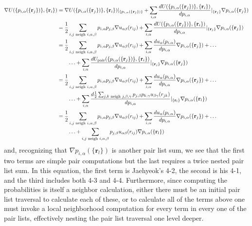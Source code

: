 \documentclass[11pt, oneside]{article}   	%
\begin{document}
\begin{align}
\nabla U(\{p_{i, \alpha}(\{\mathbf{r}_j\})\}, \{\mathbf{r}_i\}) &= \nabla U(\{p_{i, \alpha}(\{\mathbf{r}_j\})\}, \{\mathbf{r}_i\}) |_{\{p_{i, \alpha}(\{\mathbf{r}_j\})\}} + \sum_{i, \alpha} \frac{d U(\{p_{i, \alpha}(\{\mathbf{r}_j\})\}, \{\mathbf{r}_i\})}{d p_{i, \alpha}} |_{\{\mathbf{r}_j\}} \nabla p_{i, \alpha}(\{\mathbf{r}_j\}) \\
&= \frac{1}{2} \sum_{i, j \text{ neigh } i, \alpha, \beta} p_{i, \alpha} p_{j, \beta} \nabla u_{\alpha\beta}(r_{ij}) + \sum_{i, \alpha} \frac{d U(\{p_{i, \alpha}(\{\mathbf{r}_j\})\}, \{\mathbf{r}_i\})}{d p_{i, \alpha}} |_{\{\mathbf{r}_j\}} \nabla p_{i, \alpha}(\{\mathbf{r}_j\}) \\
&=  \frac{1}{2} \sum_{i, j \text{ neigh } i, \alpha, \beta} p_{i, \alpha} p_{j, \beta} \nabla u_{\alpha\beta}(r_{ij}) + \sum_{i, \alpha} \frac{du_\alpha(p_{i, \alpha})}{d p_{i, \alpha}} \nabla p_{i, \alpha}(\{\mathbf{r}_j\})  +  \ldots \notag \\  & \qquad \ldots + \sum_{i, \alpha} \frac{d U_{\text{pair}}(\{p_{i, \alpha}(\{\mathbf{r}_j\})\}, \{\mathbf{r}_i\})}{d p_{i, \alpha}} |_{\{\mathbf{r}_j\}} \nabla p_{i, \alpha}(\{\mathbf{r}_j\}) \\
&= \frac{1}{2} \sum_{i, j \text{ neigh } i, \alpha, \beta} p_{i, \alpha} p_{j, \beta} \nabla u_{\alpha\beta}(r_{ij}) + \sum_{i, \alpha} \frac{du_\alpha(p_{i, \alpha})}{d p_{i, \alpha}} \nabla p_{i, \alpha}(\{\mathbf{r}_j\})  +  \ldots \notag \\  & \qquad \ldots + \sum_{i, \alpha} \frac{d \frac{1}{2} \sum_{j, k \text{ neigh } j, \beta, \gamma} p_{j, \beta} p_{k, \gamma} u_{\beta\gamma}(r_{jk})}{d p_{i, \alpha}} |_{\{\mathbf{r}_l\}} \nabla p_{i, \alpha}(\{\mathbf{r}_l\}) \\
&= \frac{1}{2} \sum_{i, j \text{ neigh } i, \alpha, \beta} p_{i, \alpha} p_{j, \beta} \nabla u_{\alpha\beta}(r_{ij}) + \sum_{i, \alpha} \frac{du_\alpha(p_{i, \alpha})}{d p_{i, \alpha}} \nabla p_{i, \alpha}(\{\mathbf{r}_j\})  +  \ldots \notag \\  & \qquad \ldots + \sum_{i, j \text{ neigh } i, \alpha, \beta} p_{j, \beta} u_{\alpha\beta}(r_{ij}) \nabla p_{i, \alpha}(\{\mathbf{r}_l\})
\end{align}
and, recognizing that $\nabla p_{i, \alpha}(\{\mathbf{r}_l\})$ is another pair list sum, we see that the first two terms are simple pair computations but the last requires a twice nested pair list sum. In this equation, the first term is Jaehyeok's 4-2, the second is his 4-1, and the third includes both 4-3 and 4-4. Furthermore, since computing the probabilities is itself a neighbor calculation, either there must be an initial pair list traversal to calculate each of these, or to calculate all of the terms above one must invoke a local neighborhood computation for every term in every one of the pair lists, effectively nesting the pair list traversal one level deeper.
\end{document}
